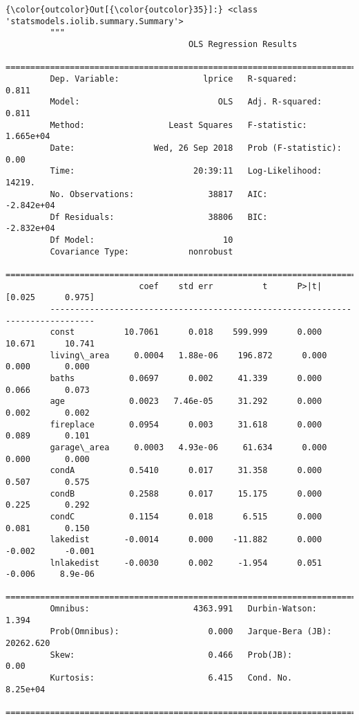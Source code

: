 \documentclass[11pt]{article}
\begin{document}
\begin{Verbatim}[commandchars=\\\{\}]
{\color{outcolor}Out[{\color{outcolor}35}]:} <class 'statsmodels.iolib.summary.Summary'>
         """
                                     OLS Regression Results                            
         ==============================================================================
         Dep. Variable:                 lprice   R-squared:                       0.811
         Model:                            OLS   Adj. R-squared:                  0.811
         Method:                 Least Squares   F-statistic:                 1.665e+04
         Date:                Wed, 26 Sep 2018   Prob (F-statistic):               0.00
         Time:                        20:39:11   Log-Likelihood:                 14219.
         No. Observations:               38817   AIC:                        -2.842e+04
         Df Residuals:                   38806   BIC:                        -2.832e+04
         Df Model:                          10                                         
         Covariance Type:            nonrobust                                         
         ===============================================================================
                           coef    std err          t      P>|t|      [0.025      0.975]
         -------------------------------------------------------------------------------
         const          10.7061      0.018    599.999      0.000      10.671      10.741
         living\_area     0.0004   1.88e-06    196.872      0.000       0.000       0.000
         baths           0.0697      0.002     41.339      0.000       0.066       0.073
         age             0.0023   7.46e-05     31.292      0.000       0.002       0.002
         fireplace       0.0954      0.003     31.618      0.000       0.089       0.101
         garage\_area     0.0003   4.93e-06     61.634      0.000       0.000       0.000
         condA           0.5410      0.017     31.358      0.000       0.507       0.575
         condB           0.2588      0.017     15.175      0.000       0.225       0.292
         condC           0.1154      0.018      6.515      0.000       0.081       0.150
         lakedist       -0.0014      0.000    -11.882      0.000      -0.002      -0.001
         lnlakedist     -0.0030      0.002     -1.954      0.051      -0.006     8.9e-06
         ==============================================================================
         Omnibus:                     4363.991   Durbin-Watson:                   1.394
         Prob(Omnibus):                  0.000   Jarque-Bera (JB):            20262.620
         Skew:                           0.466   Prob(JB):                         0.00
         Kurtosis:                       6.415   Cond. No.                     8.25e+04
         ==============================================================================
         

\end{Verbatim}
\end{document}
